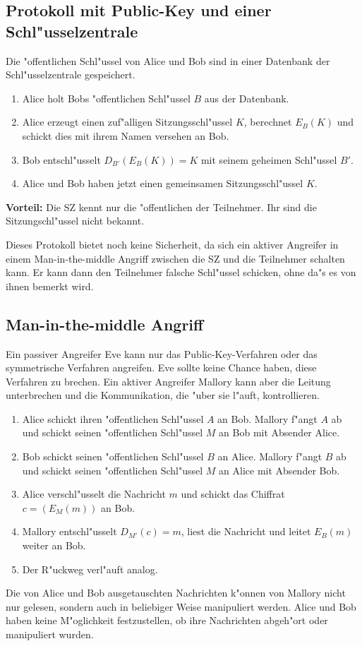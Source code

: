 \subsection{Protokoll mit Public-Key und einer Schl"usselzentrale}\label{SZmitPK}
Die "offentlichen Schl"ussel von Alice und Bob sind in einer Datenbank
der Schl"usselzentrale gespeichert.
\begin{enumerate}
   \item Alice holt Bobs "offentlichen Schl"ussel $B$ aus der Datenbank.
   \item Alice erzeugt einen zuf"alligen Sitzungsschl"ussel $K$,
         berechnet $E_B(K)$ und schickt dies mit ihrem Namen versehen
         an Bob.
   \item Bob entschl"usselt $D_{B'}(E_B(K))=K$ mit seinem geheimen 
         Schl"ussel $B'$.
   \item Alice und Bob haben jetzt einen gemeinsamen Sitzungsschl"ussel $K$.
\end{enumerate}
{\bf Vorteil:} Die SZ kennt nur die "offentlichen der Teilnehmer. Ihr sind die
Sitzungschl"ussel nicht bekannt.

Dieses Protokoll bietet noch keine Sicherheit, da sich ein aktiver Angreifer
in einem Man-in-the-middle Angriff zwischen die SZ und die Teilnehmer
schalten kann. Er kann dann den Teilnehmer falsche Schl"ussel schicken,
ohne da"s es von ihnen bemerkt wird.

\subsection{Man-in-the-middle Angriff}
Ein passiver Angreifer Eve kann nur das Public-Key-Verfahren oder das
symmetrische Verfahren angreifen. Eve sollte keine Chance haben, diese
Verfahren zu brechen.  Ein aktiver Angreifer Mallory kann aber die
Leitung unterbrechen und die Kommunikation, die "uber sie l"auft,
kontrollieren.
\begin{enumerate}
  \item Alice schickt ihren "offentlichen Schl"ussel $A$ an
        Bob. Mallory f"angt $A$ ab und schickt seinen "offentlichen
        Schl"ussel $M$ an Bob mit Absender Alice.
  \item Bob schickt seinen "offentlichen Schl"ussel $B$ an
        Alice. Mallory f"angt $B$ ab und schickt seinen "offentlichen
        Schl"ussel $M$ an Alice mit Absender Bob.
  \item Alice verschl"usselt die Nachricht $m$ und schickt das Chiffrat
        $c=(E_M(m))$ an Bob.
  \item Mallory entschl"usselt $D_{M'}(c)=m$, liest die Nachricht
        und leitet $E_B(m)$ weiter an Bob.
  \item Der R"uckweg verl"auft analog.
\end{enumerate}
Die von Alice und Bob ausgetauschten Nachrichten k"onnen von Mallory
nicht nur gelesen, sondern auch in beliebiger Weise manipuliert
werden. Alice und Bob haben keine M"oglichkeit festzustellen, ob
ihre Nachrichten abgeh"ort oder manipuliert wurden.

